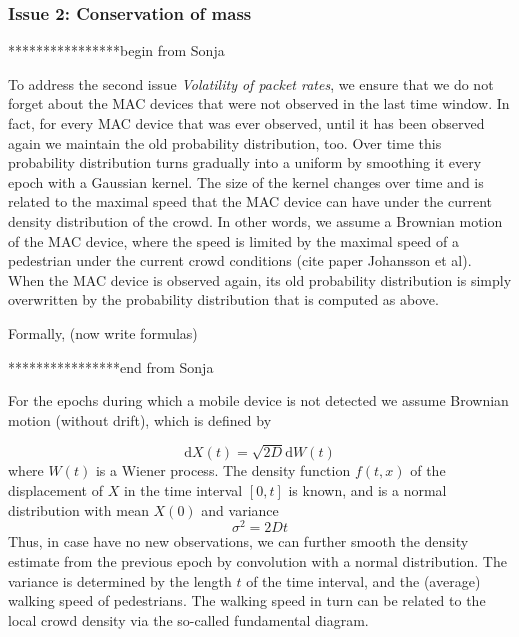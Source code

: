 \documentclass[10pt,a4paper]{article}
\begin{document}
\subsubsection{Issue 2: Conservation of mass }
****************begin from Sonja

To address the second issue {\it Volatility of packet rates}, we ensure that we do not forget about the MAC devices that were not observed in the last time window. In fact, for every MAC device that was ever observed, until it has been observed again we maintain the old probability distribution, too. Over time this probability distribution turns gradually into a uniform by smoothing it every epoch with a Gaussian kernel. The size of the kernel changes over time and is related to the maximal speed that the MAC device can have under the current density distribution of the crowd. In other words, we assume a Brownian motion of the MAC device, where the speed is limited by the maximal speed of a pedestrian under the current crowd conditions (cite paper Johansson et al). When the MAC device is observed again, its old probability distribution is simply overwritten by the probability distribution that is computed as above. 

Formally,  (now write formulas) 

****************end from Sonja\\

For the epochs during which a mobile device is not detected we assume Brownian motion (without drift), which is defined by

\begin{equation}
\text{d}X(t)=\sqrt{2D}\text{d}W(t)
\end{equation}
where $W(t)$ is a Wiener process. The density function $f(t,x)$ of the displacement of $X$ in the time interval $[0,t]$ is known, and is a normal distribution with mean $X(0)$ and variance
\begin{equation}
\sigma^2=2Dt
\end{equation}
Thus, in case have no new observations, we can further smooth the density estimate from the previous epoch by convolution with a normal distribution. 
The variance is determined by the length $t$ of the time interval, and the (average) walking speed of pedestrians. The walking speed in turn can be related to the local crowd density via the so-called fundamental diagram.\\
\end{document}
